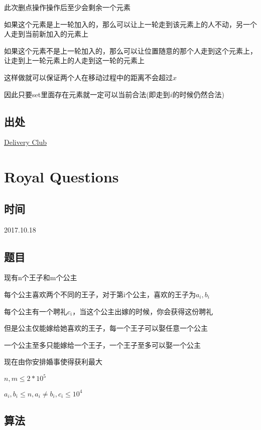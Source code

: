\documentclass[a4paper]{article}
\begin{document}
		此次删点操作操作后至少会剩余一个元素
		
		如果这个元素是上一轮加入的，那么可以让上一轮走到该元素上的人不动，另一个人走到当前新加入的元素上
		
		如果这个元素不是上一轮加入的，那么可以让位置随意的那个人走到这个元素上，让走到上一轮元素上的人走到这一轮的元素上
		
		这样做就可以保证两个人在移动过程中的距离不会超过$x$
		
		因此只要set里面存在元素就一定可以当前合法(即走到$i$的时候仍然合法)
		
	\subsection{出处}
	
		\href {http://codeforces.com/problemset/problem/875/E}{Delivery Club}
	
	\newpage
	
		\section{Royal Questions}
	
	\subsection{时间}
	
		2017.10.18
		
	\subsection{题目}
		
		现有$\text{n}$个王子和$\text{m}$个公主
		
		每个公主喜欢两个不同的王子，对于第$\text{i}$个公主，喜欢的王子为$a_i, b_i$
		
		每个公主有一个聘礼$c_i$，当这个公主出嫁的时候，你会获得这份聘礼
		
		但是公主仅能嫁给她喜欢的王子，每一个王子可以娶任意一个公主
		
		一个公主至多只能嫁给一个王子，一个王子至多可以娶一个公主
		
		现在由你安排婚事使得获利最大
		
		$n, m \leq 2 * 10^5$
		
		$a_i, b_i \leq n , a_i \not= b_i , c_i \leq 10^4$
		
	\subsection{算法}
		
\end{document}

